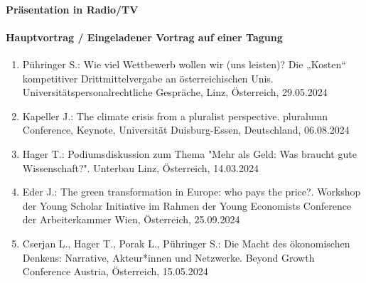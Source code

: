 \paragraph{Präsentation in Radio/TV}
\paragraph{Hauptvortrag / Eingeladener Vortrag auf einer Tagung}
\begin{enumerate}
	\item Pühringer S.: Wie viel Wettbewerb wollen wir (uns leisten)? Die „Kosten“ kompetitiver Drittmittelvergabe an österreichischen Unis. Universitätspersonalrechtliche Gespräche, Linz, Österreich, 29.05.2024
	\item Kapeller J.: The climate crisis from a pluralist perspective. pluralumn Conference, Keynote, Universität Duisburg-Essen, Deutschland, 06.08.2024
	\item Hager T.: Podiumsdiskussion zum Thema "Mehr als Geld: Was braucht gute Wissenschaft?". Unterbau Linz, Österreich, 14.03.2024
	\item Eder J.: The green transformation in Europe: who pays the price?. Workshop der Young Scholar Initiative im Rahmen der Young Economists Conference der Arbeiterkammer Wien, Österreich, 25.09.2024
	\item Cserjan L., Hager T., Porak L., Pühringer S.: Die Macht des ökonomischen Denkens: Narrative, Akteur*innen und Netzwerke. Beyond Growth Conference Austria, Österreich, 15.05.2024
\end{enumerate}
